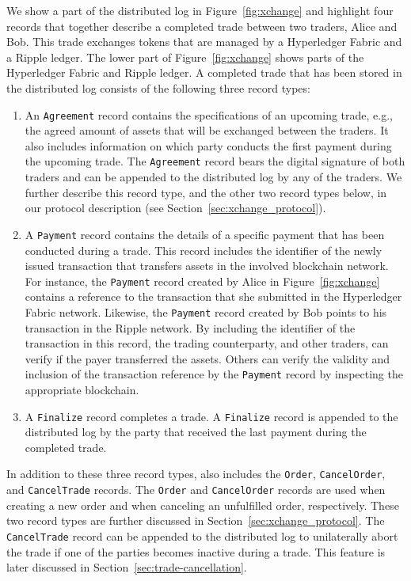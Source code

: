 We show a part of the distributed log in Figure~\ref{fig:xchange} and highlight four records that together describe a completed trade between two traders, Alice and Bob.
This trade exchanges tokens that are managed by a Hyperledger Fabric and a Ripple ledger.
The lower part of Figure~\ref{fig:xchange} shows parts of the Hyperledger Fabric and Ripple ledger.
A completed trade that has been stored in the distributed log consists of the following three record types:

\begin{enumerate}
	\item An \texttt{Agreement} record contains the specifications of an upcoming trade, e.g., the agreed amount of assets that will be exchanged between the traders.
	It also includes information on which party conducts the first payment during the upcoming trade.
	The \texttt{Agreement} record bears the digital signature of both traders and can be appended to the distributed log by any of the traders.
	We further describe this record type, and the other two record types below, in our protocol description (see Section~\ref{sec:xchange_protocol}).
	\item A \texttt{Payment} record contains the details of a specific payment that has been conducted during a trade.
	This record includes the identifier of the newly issued transaction that transfers assets in the involved blockchain network.
	For instance, the \texttt{Payment} record created by Alice in Figure~\ref{fig:xchange} contains a reference to the transaction that she submitted in the Hyperledger Fabric network.
	Likewise, the \texttt{Payment} record created by Bob points to his transaction in the Ripple network.
	By including the identifier of the transaction in this record, the trading counterparty, and other traders, can verify if the payer transferred the assets.
	Others can verify the validity and inclusion of the transaction reference by the \texttt{Payment} record by inspecting the appropriate blockchain.
	\item A \texttt{Finalize} record completes a trade.
	A \texttt{Finalize} record is appended to the distributed log by the party that received the last payment during the completed trade.
\end{enumerate}

In addition to these three record types, \ModelName{} also includes the \texttt{Order}, \texttt{CancelOrder}, and \texttt{CancelTrade} records.
The \texttt{Order} and \texttt{CancelOrder} records are used when creating a new order and when canceling an unfulfilled order, respectively.
These two record types are further discussed in Section~\ref{sec:xchange_protocol}.
The \texttt{CancelTrade} record can be appended to the distributed log to unilaterally abort the trade if one of the parties becomes inactive during a trade.
This feature is later discussed in Section~\ref{sec:trade-cancellation}.

